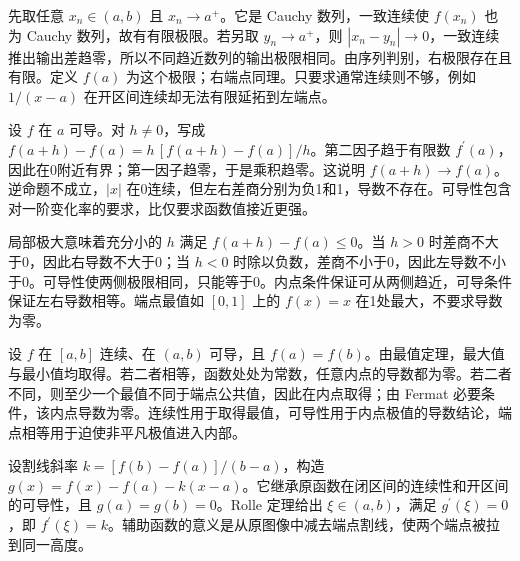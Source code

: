 \documentclass[12pt,fontset=fandol]{ctexart}
\begin{document}
\begin{solve}\label{ans:c7q6}
先取任意 $x_n\in(a,b)$ 且 $x_n\to a^+$。它是 Cauchy 数列，一致连续使 $f(x_n)$ 也为 Cauchy 数列，故有有限极限。若另取 $y_n\to a^+$，则 $|x_n-y_n|\to0$，一致连续推出输出差趋零，所以不同趋近数列的输出极限相同。由序列判别，右极限存在且有限。定义 $f(a)$ 为这个极限；右端点同理。只要求通常连续则不够，例如 $1/(x-a)$ 在开区间连续却无法有限延拓到左端点。
\end{solve}

\begin{solve}\label{ans:c7q7}
设 $f$ 在 $a$ 可导。对 $h\ne0$，写成 $f(a+h)-f(a)=h\,[f(a+h)-f(a)]/h$。第二因子趋于有限数 $f^{\prime}(a)$，因此在0附近有界；第一因子趋零，于是乘积趋零。这说明 $f(a+h)\to f(a)$。逆命题不成立，$|x|$ 在0连续，但左右差商分别为负1和1，导数不存在。可导性包含对一阶变化率的要求，比仅要求函数值接近更强。
\end{solve}

\begin{solve}\label{ans:c7q8}
局部极大意味着充分小的 $h$ 满足 $f(a+h)-f(a)\le0$。当 $h>0$ 时差商不大于0，因此右导数不大于0；当 $h<0$ 时除以负数，差商不小于0，因此左导数不小于0。可导性使两侧极限相同，只能等于0。内点条件保证可从两侧趋近，可导条件保证左右导数相等。端点最值如 $[0,1]$ 上的 $f(x)=x$ 在1处最大，不要求导数为零。
\end{solve}

\begin{solve}\label{ans:c7q9}
设 $f$ 在 $[a,b]$ 连续、在 $(a,b)$ 可导，且 $f(a)=f(b)$。由最值定理，最大值与最小值均取得。若二者相等，函数处处为常数，任意内点的导数都为零。若二者不同，则至少一个最值不同于端点公共值，因此在内点取得；由 Fermat 必要条件，该内点导数为零。连续性用于取得最值，可导性用于内点极值的导数结论，端点相等用于迫使非平凡极值进入内部。
\end{solve}

\begin{solve}\label{ans:c7q10}
设割线斜率 $k=[f(b)-f(a)]/(b-a)$，构造 $g(x)=f(x)-f(a)-k(x-a)$。它继承原函数在闭区间的连续性和开区间的可导性，且 $g(a)=g(b)=0$。Rolle 定理给出 $\xi\in(a,b)$，满足 $g^{\prime}(\xi)=0$，即 $f^{\prime}(\xi)=k$。辅助函数的意义是从原图像中减去端点割线，使两个端点被拉到同一高度。
\end{solve}
\end{document}
